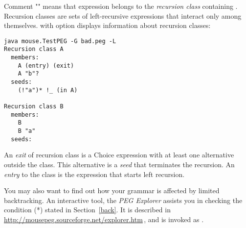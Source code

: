 Comment ""  means that expression belongs to the \emph{recursion class} containing .
Recursion classes are sets of left-recursive expressions 
that interact only among themselves.
 with option  displays information about recursion classes:

\small
\begin{Verbatim}[samepage=true,xleftmargin=15mm,baselinestretch=0.8]
java mouse.TestPEG -G bad.peg -L
Recursion class A
  members:
    A (entry) (exit)
    A "b"?
  seeds:
    (!"a")* !_ (in A)

Recursion class B
  members:
    B
    B "a"
  seeds:
\end{Verbatim}
\normalsize

An \emph{exit} of recursion class is 
a Choice expression with at least one alternative outside the class.
This alternative is a \emph{seed} that terminates the recursion.
An \emph{entry} to the class is the expression that starts left recursion.

\medskip
You may also want to find out how your grammar is affected by limited backtracking.
\newline
An interactive tool, the \textsl{PEG Explorer} assists you in checking the condition (*)
stated in Section~\ref{back}.
It is described in \url{http://mousepeg.sourceforge.net/explorer.htm}\,,
and is invoked as .




